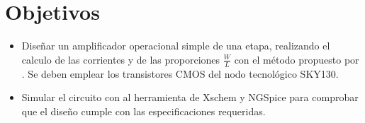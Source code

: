 \section{Objetivos \label{sec:obj}}


\begin{itemize} 
	\item Diseñar un amplificador operacional simple de una etapa, realizando el calculo de las corrientes y de las proporciones $\frac{W}{L}$ con el método propuesto por \cite{Allen_2012}. Se deben emplear los transistores CMOS del nodo tecnológico SKY130.
	\item Simular el circuito con al herramienta de Xschem y NGSpice para comprobar que el diseño cumple con las especificaciones requeridas.	
\end{itemize}
